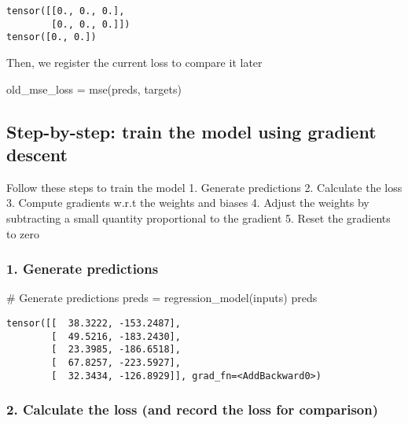 \documentclass[
  letterpaper,
  DIV=11,
  numbers=noendperiod]{scrartcl}
\newenvironment{Shaded}{\begin{snugshade}}{\end{snugshade}}
\newcommand{\CommentTok}[1]{\textcolor[rgb]{0.37,0.37,0.37}{#1}}
\newcommand{\NormalTok}[1]{\textcolor[rgb]{0.00,0.23,0.31}{#1}}
\newcommand{\OperatorTok}[1]{\textcolor[rgb]{0.37,0.37,0.37}{#1}}
\begin{document}
\begin{verbatim}
tensor([[0., 0., 0.],
        [0., 0., 0.]])
tensor([0., 0.])
\end{verbatim}

Then, we register the current loss to compare it later

\begin{Shaded}
\begin{Highlighting}[]
\NormalTok{old\_mse\_loss }\OperatorTok{=}\NormalTok{ mse(preds, targets)}
\end{Highlighting}
\end{Shaded}

\hypertarget{step-by-step-train-the-model-using-gradient-descent}{%
\subsection{Step-by-step: train the model using gradient
descent}\label{step-by-step-train-the-model-using-gradient-descent}}

Follow these steps to train the model 1. Generate predictions 2.
Calculate the loss 3. Compute gradients w.r.t the weights and biases 4.
Adjust the weights by subtracting a small quantity proportional to the
gradient 5. Reset the gradients to zero

\hypertarget{generate-predictions}{%
\subsubsection{1. Generate predictions}\label{generate-predictions}}

\begin{Shaded}
\begin{Highlighting}[]
\CommentTok{\# Generate predictions}
\NormalTok{preds }\OperatorTok{=}\NormalTok{ regression\_model(inputs)}
\NormalTok{preds}
\end{Highlighting}
\end{Shaded}

\begin{verbatim}
tensor([[  38.3222, -153.2487],
        [  49.5216, -183.2430],
        [  23.3985, -186.6518],
        [  67.8257, -223.5927],
        [  32.3434, -126.8929]], grad_fn=<AddBackward0>)
\end{verbatim}

\hypertarget{calculate-the-loss-and-record-the-loss-for-comparison}{%
\subsubsection{2. Calculate the loss (and record the loss for
comparison)}\label{calculate-the-loss-and-record-the-loss-for-comparison}}
\end{document}
